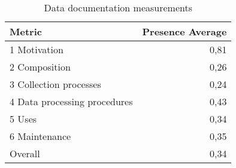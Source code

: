 \begin{table}[t]
\caption{Data documentation measurements}
\label{tab:dts-average}
\begin{tabular}{|l|r|}
\hline
Metric & Presence Average \\
\hline
1 Motivation & 0,81 \\
2 Composition & 0,26 \\
3 Collection processes & 0,24 \\
4 Data processing procedures & 0,43 \\
5 Uses & 0,34 \\
6 Maintenance & 0,35 \\
Overall & 0,34 \\
\hline
\end{tabular}
\end{table}
